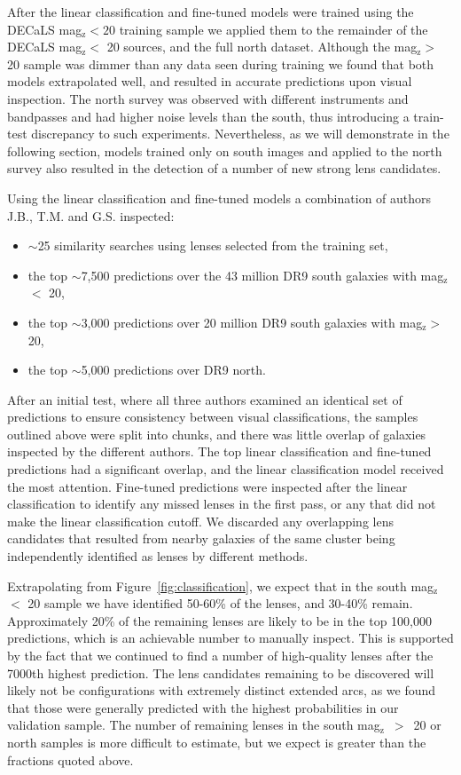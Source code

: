 \documentclass{aastex631}
\newcommand{\zmag}{mag$_{\mathrm{z}}$}
\begin{document}
After the linear classification and fine-tuned models were trained using the DECaLS \zmag $< 20$ training sample we applied them to the remainder of the DECaLS \zmag $<$ 20 sources, and the full north dataset. Although the \zmag $>$ 20 sample was dimmer than any data seen during training we found that both models extrapolated well, and resulted in accurate predictions upon visual inspection. The north survey was observed with different instruments and bandpasses and had higher noise levels than the south, thus introducing a train-test discrepancy to such experiments. Nevertheless, as we will demonstrate in the following section, models trained only on south images and applied to the north survey also resulted in the detection of a number of new strong lens candidates. 

Using the linear classification and fine-tuned models a combination of authors J.B., T.M. and G.S. inspected:
\begin{itemize}
    \item $\sim$25 similarity searches using lenses selected from the training set,
	\item the top $\sim$7,500 predictions over the 43 million DR9 south galaxies with \zmag $<$ 20,
    \item the top $\sim$3,000 predictions over 20 million DR9 south galaxies with \zmag $>$ 20,
    \item the top $\sim$5,000 predictions over DR9 north.
\end{itemize}
After an initial test, where all three authors examined an identical set of predictions to ensure consistency between visual classifications, the samples outlined above were split into chunks, and there was little overlap of galaxies inspected by the different authors. The top linear classification and fine-tuned predictions had a significant overlap, and the linear classification model received the most attention. Fine-tuned predictions were inspected after the linear classification to identify any missed lenses in the first pass, or any that did not make the linear classification cutoff. We discarded any overlapping lens candidates that resulted from nearby galaxies of the same cluster being independently identified as lenses by different methods. 

Extrapolating from Figure~\ref{fig:classification}, we expect that in the south \zmag $<$ 20 sample we have identified 50-60\% of the lenses, and 30-40\% remain. Approximately 20\% of the remaining lenses are likely to be in the top 100,000 predictions, which is an achievable number to manually inspect. This is supported by the fact that we continued to find a number of high-quality lenses after the 7000th highest prediction. The lens candidates remaining to be discovered will likely not be configurations with extremely distinct extended arcs, as we found that those were generally predicted with the highest probabilities in our validation sample. The number of remaining lenses in the south \zmag~$>$~20 or north samples is more difficult to estimate, but we expect is greater than the fractions quoted above.
\end{document}

